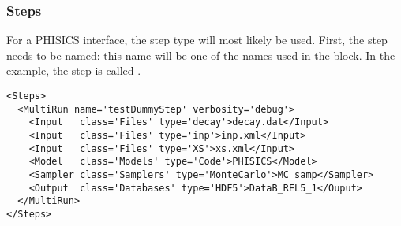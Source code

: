 \subsubsection{Steps}
For a PHISICS interface, the  step type will most likely be used. First, the step needs
to be named: this name will be one of the names used in the  block.
In the example, the step is called .
%
\begin{lstlisting}[style=XML]
<Steps>
  <MultiRun name='testDummyStep' verbosity='debug'>
    <Input   class='Files' type='decay'>decay.dat</Input>
    <Input   class='Files' type='inp'>inp.xml</Input>
    <Input   class='Files' type='XS'>xs.xml</Input>
    <Model   class='Models' type='Code'>PHISICS</Model>
    <Sampler class='Samplers' type='MonteCarlo'>MC_samp</Sampler>
    <Output  class='Databases' type='HDF5'>DataB_REL5_1</Ouput>
  </MultiRun>
</Steps>
\end{lstlisting}
%
